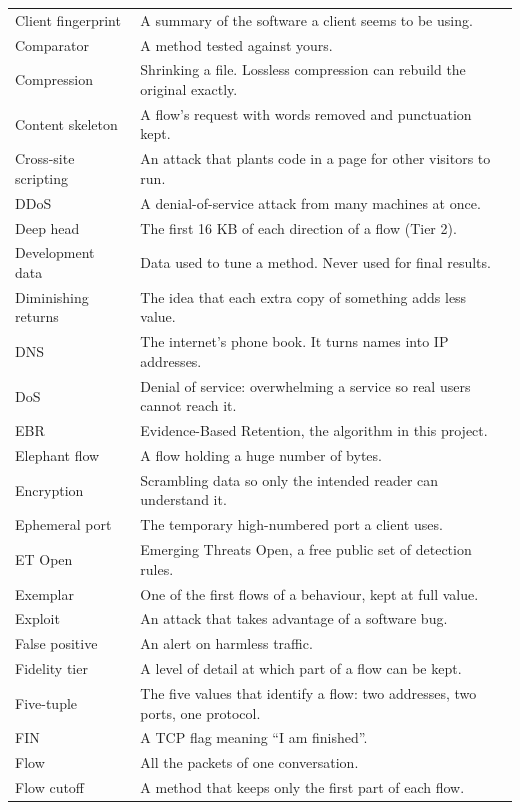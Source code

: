 {\begin{longtable}{>{\raggedright\arraybackslash}p{37mm} >{\raggedright\arraybackslash}p{116mm}}
Client fingerprint & A summary of the software a client seems to be using.\\
Comparator & A method tested against yours.\\
Compression & Shrinking a file. Lossless compression can rebuild the original exactly.\\
Content skeleton & A flow's request with words removed and punctuation kept.\\
Cross-site scripting & An attack that plants code in a page for other visitors to run.\\
DDoS & A denial-of-service attack from many machines at once.\\
Deep head & The first 16 KB of each direction of a flow (Tier 2).\\
Development data & Data used to tune a method. Never used for final results.\\
Diminishing returns & The idea that each extra copy of something adds less value.\\
DNS & The internet's phone book. It turns names into IP addresses.\\
DoS & Denial of service: overwhelming a service so real users cannot reach it.\\
EBR & Evidence-Based Retention, the algorithm in this project.\\
Elephant flow & A flow holding a huge number of bytes.\\
Encryption & Scrambling data so only the intended reader can understand it.\\
Ephemeral port & The temporary high-numbered port a client uses.\\
ET Open & Emerging Threats Open, a free public set of detection rules.\\
Exemplar & One of the first flows of a behaviour, kept at full value.\\
Exploit & An attack that takes advantage of a software bug.\\
False positive & An alert on harmless traffic.\\
Fidelity tier & A level of detail at which part of a flow can be kept.\\
Five-tuple & The five values that identify a flow: two addresses, two ports, one protocol.\\
FIN & A TCP flag meaning ``I am finished''.\\
Flow & All the packets of one conversation.\\
Flow cutoff & A method that keeps only the first part of each flow.\\

\end{longtable}}
